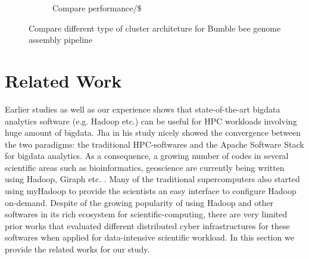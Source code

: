 \documentclass[conference]{IEEEtran}
\begin{document}
\begin{figure}[htb]
\begin{subfigure}[b]{0.5\textwidth}
                \caption{Compare performance/\$}
                \label{fig:DifferentArchitecturesPerfPerDollar}
        \end{subfigure}
        \caption{Compare different type of cluster architeture for Bumble bee genome assembly pipeline}
  \label{fig:DifferentArchitectures}
\end{figure}

\section {Related Work} \label{Related Work}
Earlier studies \cite{schadoop:fadika} \cite{schadoop:jha} as well as our experience shows that state-of-the-art bigdata analytics software (e.g. Hadoop etc.) can be useful for HPC workloads involving huge amount of bigdata.
Jha \cite{schadoop:jha} in his study nicely showed the convergence between the two paradigms: the traditional HPC-softwares and the Apache Software Stack for bigdata analytics.
As a consequence, a growing number of codes in several scientific areas such as bioinformatics, geoscience are currently being written using Hadoop, Giraph etc. \cite{fw:myhadoop}.
Many of the traditional supercomputers also started using myHadoop \cite{fw:myhadoop} to provide the scientists an easy interface to configure Hadoop on-demand. 
Despite of the growing popularity of using Hadoop and other softwares in its rich ecosystem for scientific-computing, there are very limited prior works that evaluated different distributed cyber infrastructures for these softwares when applied for data-intensive scientific workload.
In this section we provide the related works for our study.
\end{document}
